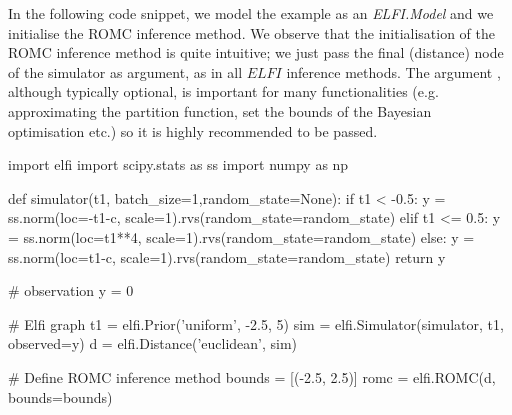 In the following code snippet, we model the example as an
\textit{ELFI.Model} and we initialise the ROMC inference method. We
observe that the initialisation of the ROMC inference method is quite
intuitive; we just pass the final (distance) node of the simulator as
argument, as in all $\textit{ELFI}$ inference methods. The argument
, although typically optional, is important for many
functionalities (e.g. approximating the partition function, set the bounds of the Bayesian optimisation etc.) so it is highly recommended to be passed.

\begin{pythoncode}
  import elfi
  import scipy.stats as ss
  import numpy as np
  
  def simulator(t1, batch_size=1,random_state=None):
      if t1 < -0.5:
          y = ss.norm(loc=-t1-c, scale=1).rvs(random_state=random_state)
      elif t1 <= 0.5:
          y = ss.norm(loc=t1**4, scale=1).rvs(random_state=random_state)
      else:
          y = ss.norm(loc=t1-c, scale=1).rvs(random_state=random_state)
      return y

  # observation
  y = 0
      
  # Elfi graph    
  t1 = elfi.Prior('uniform', -2.5, 5)
  sim = elfi.Simulator(simulator, t1, observed=y)
  d = elfi.Distance('euclidean', sim)

  # Define ROMC inference method
  bounds = [(-2.5, 2.5)]
  romc = elfi.ROMC(d, bounds=bounds)
\end{pythoncode}


